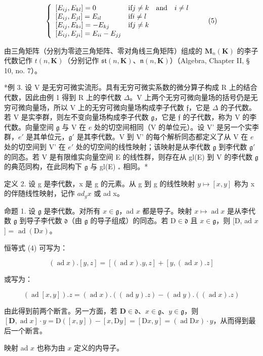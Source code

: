 \[
\left\{ \begin{array}{l l} [ E _ {i j}, E _ {k l} ] = 0 & \text {if} j \neq k \quad \text {and} \quad i \neq l \\ {} [ E _ {i j}, E _ {j l} ] = E _ {i l} & \text {if} i \neq l \\ {} [ E _ {i j}, E _ {k i} ] = - E _ {k j} & \text {if} j \neq k \\ {} [ E _ {i j}, E _ {j i} ] = E _ {i i} - E _ {j j} \end{array} \right.\tag{5}
\]

由三角矩阵（分别为零迹三角矩阵、零对角线三角矩阵）组成的 \(\mathbf{M}_{n}(\mathbf{K})\) 的李子代数记作 \(t(n,\mathbf{K})\)（分别记作 \(\mathfrak{st}(n,\mathbf{K})\)、\(\mathfrak{n}(n,\mathbf{K})\)）（Algebra, Chapter II, § 10, no. 7）。

*例 3. 设 V 是无穷可微实流形。具有无穷可微实系数的微分算子构成 R 上的结合代数，因此由例 1 得到 R 上的李代数 \(\Delta\)。V 上两个无穷可微向量场的括号仍是无穷可微向量场，所以 V 上的无穷可微向量场构成李子代数 \(\mathfrak{f}\)，它是 \(\Delta\) 的子代数。若 V 是实李群，则左不变向量场构成李子代数 \(\mathfrak{g}\)，它是 \(\mathfrak{f}\) 的子代数，称为 V 的李代数。向量空间 \(\mathfrak{g}\) 与 V 在 \(e\) 处的切空间相同（V 的单位元）。设 V' 是另一个实李群，\(e'\) 是其单位元，\(\mathfrak{g}'\) 是其李代数。V 到 V' 的每个解析同态都定义了从 V 在 \(e\) 处的切空间到 V' 在 \(e'\) 处的切空间的线性映射；该映射是从李代数 \(\mathfrak{g}\) 到李代数 \(\mathfrak{g}'\) 的同态。若 V 是有限维实向量空间 E 的线性群，则存在从 gl(E) 到 V 的李代数 \(\mathfrak{g}\) 的典范同构，在此同构下 \(\mathfrak{g}\) 与 gl(E) \(_*\) 相同。*

定义 2. 设 g 是李代数，x 是 g 的元素。从 g 到 g 的线性映射 \(y \mapsto [x, y]\) 称为 x 的伴随线性映射，记作 \(ad_{g}x\) 或 ad x。

命题 1. 设 \(\mathfrak{g}\) 是李代数。对所有 \(x \in \mathfrak{g}\)，ad \(x\) 都是导子。映射 \(x \mapsto \operatorname{ad} x\) 是从李代数 \(\mathfrak{g}\) 到导子李代数 \(\mathfrak{d}\)（由 \(\mathfrak{g}\) 的导子组成）的同态。若 \(\mathrm{D} \in \mathfrak{d}\) 且 \(x \in \mathfrak{g}\)，则 {[}D, ad \(x\) {]} = \(\operatorname{ad}(\mathrm{D}x)\)。

恒等式 (4) 可写为：

\[
(\operatorname{ad} x). [ y, z ] = [ (\operatorname{ad} x). y, z ] + [ y, (\operatorname{ad} x). z ]
\]

或写为：

\[
(\operatorname{ad} [ x, y ]). z = (\operatorname{ad} x). ((\operatorname{ad} y). z) - (\operatorname{ad} y). ((\operatorname{ad} x). z)
\]

由此得到前两个断言。另一方面，若 \(\mathbf{D} \in \mathfrak{d}\)、\(x \in \mathfrak{g}\)、\(y \in \mathfrak{g}\)，则 \([\mathbf{D}, \operatorname{ad} x] \cdot y = \mathrm{D}([x, y]) - [x, \mathrm{D}y] = [\mathrm{D}x, y] = (\operatorname{ad} \mathrm{D}x) \cdot y\)，从而得到最后一个断言。

映射 ad \(x\) 也称为由 \(x\) 定义的内导子。

